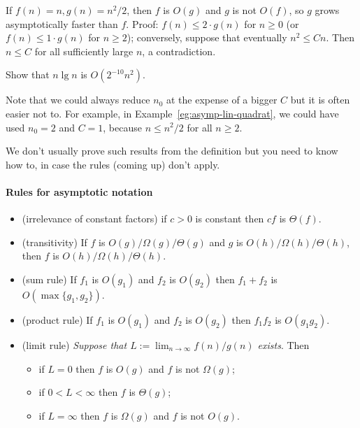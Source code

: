 \begin{Example}
\label{eg:asymp-lin-quadrat}
If $f(n) = n, g(n) = n^2/2$, then $f$ is $O(g)$ and $g$ is not
$O(f)$, so $g$ grows asymptotically faster than $f$. Proof: 
$f(n) \leq 2 \cdot g(n)$ for $n\geq 0$ (or $f(n) \leq 1 \cdot g(n)$ for 
$n \geq 2$); conversely, suppose 
that eventually $n^2 \leq Cn$. Then $n \leq C$ for all sufficiently large $n$, 
a contradiction.
\end{Example}

\begin{Boxample}[4]
Show that $n \lg n$ is $O(2^{-10} n^2)$.
\end{Boxample}

Note that we could always reduce $n_0$ at the expense of a bigger $C$ but 
it is often easier not to. For example, in Example~\ref{eg:asymp-lin-quadrat}, we could have used 
$n_0 = 2$ and $C = 1$, because $n\leq n^2/2$ for all $n\geq 2$.

We don't usually prove such results from the definition but you
need to know how to, in case the rules (coming up) don't apply.

\paragraph{Rules for asymptotic notation}
\begin{itemize}
\item (irrelevance of constant factors) if $c > 0$ is constant then $cf$ is $\Theta(f)$.
\item (transitivity) If $f$ is $O(g)/\Omega(g)/\Theta(g)$ and $g$ is 
$O(h)/\Omega(h)/\Theta(h)$, then $f$ is $O(h)/\Omega(h)/\Theta(h)$.
\item (sum rule) If $f_1$ is $O(g_1)$ and $f_2$ is $O(g_2)$ then $f_1 + f_2$ is 
$O(\max\{g_1, g_2\})$.
\item (product rule) If $f_1$ is $O(g_1)$ and $f_2$ is $O(g_2)$ then $f_1 f_2$ 
is $O(g_1 g_2)$.
\item (limit rule) \emph{Suppose that $L:=\lim_{n\to\infty} f(n)/g(n)$ exists}. 
Then
\begin{itemize}
\item if $L = 0$ then $f$ is $O(g)$ and $f$ is not $\Omega(g)$;
\item if $0 < L < \infty$ then $f$ is $\Theta(g)$;
\item if $L = \infty$ then $f$ is $\Omega(g)$ and $f$ is not $O(g)$.
\end{itemize}
\end{itemize}

